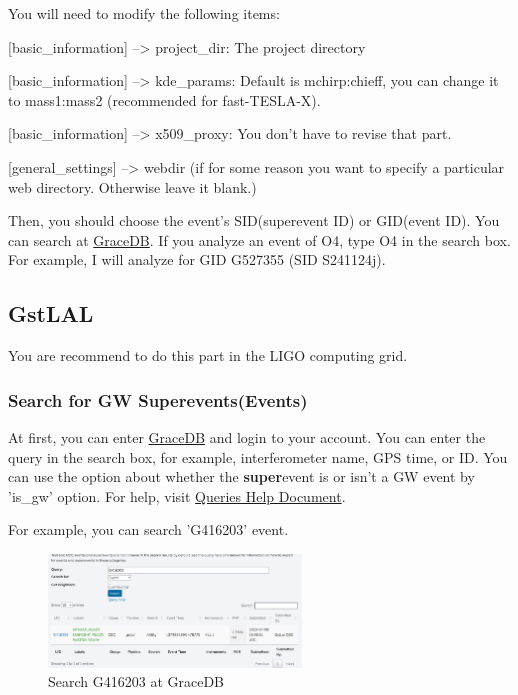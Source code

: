 You will need to modify the following items:

[basic\_information] --> project\_dir: The project directory

[basic\_information] --> kde\_params: Default is mchirp:chieff, you can change it to mass1:mass2 (recommended for fast-TESLA-X).

[basic\_information] --> x509\_proxy: You don't have to revise that part.

[general\_settings] --> webdir (if for some reason you want to specify a particular web directory. Otherwise leave it blank.)

Then, you should choose the event's SID(superevent ID) or GID(event ID). You can search at \href{https://gracedb.ligo.org/search/}{GraceDB}. If you analyze an event of O4, type O4 in the search box. For example, I will analyze for GID G527355 (SID S241124j).

\subsection{GstLAL}

You are recommend to do this part in the LIGO computing grid.

\subsubsection{Search for GW Superevents(Events)}

At first, you can enter \href{https://gracedb.ligo.org/search/}{GraceDB} and login to your account. You can enter the query in the search box, for example, interferometer name, GPS time, or ID. You can use the option about whether the \textbf{super}event is or isn't a GW event by 'is\_gw' option. For help, visit \href{https://gracedb.ligo.org/documentation/queries.html}{Queries Help Document}.

For example, you can search 'G416203' event.

\begin{figure}[h]
\centering
\includegraphics[width=0.6\textwidth]{figs/search.png}
\caption{Search G416203 at GraceDB}
\end{figure}


